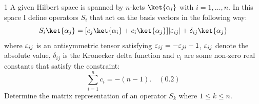 \documentclass[12pt]{article}
\begin{document}
\begin{exc}{1}
A given Hilbert space is spanned by $n$-kets $\ket{\alpha_i}$ with $i = 1,\ldots, n$. In this space I define operators $S_i$ that act on the basis vectors in the following way:
\begin{equation}
    S_i\ket{\alpha_j} = [c_j\ket{\alpha_i} + c_i\ket{\alpha_j}]|\e_{ij}| + \delta_{ij}\ket{\alpha_j}
\end{equation}
where $\varepsilon_{ij}$ is an antisymmetric tensor satisfying $\varepsilon_{ij} = -\varepsilon_{ji} - 1$, $\varepsilon_{ij}$ denote the absolute value, $\delta_{ij}$ is the Kronecker delta function and $c_i$ are some non-zero
real constants that satisfy the constraint:
\begin{equation}
    \sum_{i=1}^n c_i = -(n-1). \quad (0.2)
\end{equation}
Determine the matrix representation of an operator $S_k$ where $1 \leq k \leq n$.
\end{exc}
\end{document}
